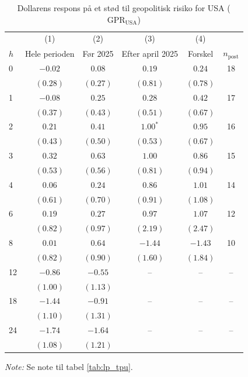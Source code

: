\begin{table}[H]
\centering
\caption{Dollarens respons på et stød til geopolitisk risiko for USA ($\text{GPR}_{\text{USA}}$)}
\label{tab:lp_gpr_usa}
\begin{threeparttable}
\begin{tabular}{l cccc c}
\toprule
 & (1) & (2) & (3) & (4) & \\
$h$ & Hele perioden & Før 2025 & Efter april 2025 & Forskel & $n_{\text{post}}$ \\
\midrule
0 & $-0.02$ & $0.08$ & $0.19$ & $0.24$ & 18 \\
 & $(0.28)$ & $(0.27)$ & $(0.81)$ & $(0.78)$ & \\[2pt]
1 & $-0.08$ & $0.25$ & $0.28$ & $0.42$ & 17 \\
 & $(0.37)$ & $(0.43)$ & $(0.51)$ & $(0.67)$ & \\[2pt]
2 & $0.21$ & $0.41$ & $1.00^{*}$ & $0.95$ & 16 \\
 & $(0.43)$ & $(0.50)$ & $(0.53)$ & $(0.67)$ & \\[2pt]
3 & $0.32$ & $0.63$ & $1.00$ & $0.86$ & 15 \\
 & $(0.53)$ & $(0.56)$ & $(0.81)$ & $(0.94)$ & \\[2pt]
4 & $0.06$ & $0.24$ & $0.86$ & $1.01$ & 14 \\
 & $(0.61)$ & $(0.70)$ & $(0.91)$ & $(1.08)$ & \\[2pt]
6 & $0.19$ & $0.27$ & $0.97$ & $1.07$ & 12 \\
 & $(0.82)$ & $(0.97)$ & $(2.19)$ & $(2.47)$ & \\[2pt]
8 & $0.01$ & $0.64$ & $-1.44$ & $-1.43$ & 10 \\
 & $(0.82)$ & $(0.90)$ & $(1.60)$ & $(1.84)$ & \\[2pt]
12 & $-0.86$ & $-0.55$ & – & – & – \\
 & $(1.00)$ & $(1.13)$ &  &  & \\[2pt]
18 & $-1.44$ & $-0.91$ & – & – & – \\
 & $(1.10)$ & $(1.31)$ &  &  & \\[2pt]
24 & $-1.74$ & $-1.64$ & – & – & – \\
 & $(1.08)$ & $(1.21)$ &  &  & \\[2pt]
\bottomrule
\end{tabular}
\begin{tablenotes}[flushleft]\footnotesize
\item \textit{Note:} Se note til tabel \ref{tab:lp_tpu}.
\end{tablenotes}
\end{threeparttable}
\end{table}